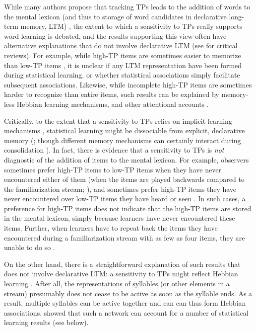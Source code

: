 \documentclass[
]{article}
\begin{document}
While many authors propose that tracking TPs leads to the addition of
words to the mental lexicon (and thus to storage of word candidates in
declarative long-term memory, LTM)
\citep{Erickson2014, Estes2007, Hay2011a, Isbilen2020, Karaman2018, Perruchet2019, Shoaib2018},
the extent to which a sensitivity to TPs really supports word learning
is debated, and the results supporting this view often have alternative
explanations that do not involve declarative LTM (see
\citep{Endress2020, Endress-stat-recall} for critical reviews). For
example, while high-TP items are sometimes easier to memorize than
low-TP items \citep{Estes2007, Hay2011a, Isbilen2020, Karaman2018}, it
is unclear if any LTM representation have been formed during statistical
learning, or whether statistical associations simply facilitate
subsequent associations. Likewise, while incomplete high-TP items are
sometimes harder to recognize than entire items, such results can be
explained by memory-less Hebbian learning mechanisms, and other
attentional accounts \citep{Endress-stat-recall}.

Critically, to the extent that a sensitivity to TPs relies on implicit
learning mechanisms \citep{Christiansen2018, Perruchet2006}, statistical
learning might be dissociable from explicit, declarative memory
(\citep{Cohen1980, Finn2016, Graf1984, Knowlton1996a, Poldrack2001, Sherman2020, Squire1992};
though different memory mechanisms can certainly interact during
consolidation \citep{Robertson2022}). In fact, there is evidence that a
sensitivity to TPs is \emph{not} diagnostic of the addition of items to
the mental lexicon. For example, observers sometimes prefer high-TP
items to low-TP items when they have never encountered either of them
(when the items are played backwards compared to the familiarization
stream; \citep{Endress-Action-Axc, Turk-Browne-reversal, Jones2007}),
and sometimes prefer high-TP items they have never encountered over
low-TP items they have heard or seen
\citep{Endress-Phantoms-Vision, Endress-Phantoms}. In such cases, a
preference for high-TP items does not indicate that the high-TP items
are stored in the mental lexicon, simply because learners have never
encountered these items. Further, when learners have to repeat back the
items they have encountered during a familiarization stream with as few
as four items, they are unable to do so \citep{Endress-stat-recall}.

On the other hand, there is a straightforward explanation of such
results that does not involve declarative LTM: a sensitivity to TPs
might reflect Hebbian learning
\citep{Endress-tone-tps, Endress-TP-Model}. After all, the
representations of syllables (or other elements in a stream) presumably
does not cease to be active as soon as the syllable ends. As a result,
multiple syllables can be active together and can can thus form Hebbian
associations. \citep{Endress-TP-Model} showed that such a network can
account for a number of statistical learning results (see below).
\end{document}
